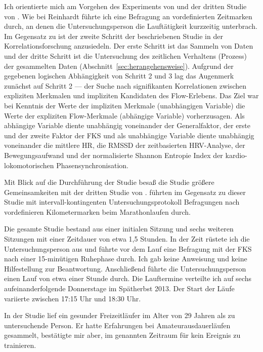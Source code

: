 Ich orientierte mich am Vorgehen des Experiments von \citet{Reinhardt2006} und der dritten Studie von \citet{Schuler2009}. Wie bei Reinhardt führte ich eine Befragung an vordefinierten Zeitmarken durch, an denen die Untersuchungsperson die Lauftätigkeit kurzzeitig unterbrach. Im Gegensatz zu \citet{Reinhardt2006} ist der zweite Schritt der beschriebenen Studie in der Korrelationsforschung anzusiedeln. Der erste Schritt ist das Sammeln von Daten und der dritte Schritt ist die Untersuchung des zeitlichen Verhaltens (Prozess) der gesammelten Daten (Abschnitt~\ref{sec:herangehensweise}). Aufgrund der gegebenen logischen Abhängigkeit von Schritt 2 und 3 lag das Augenmerk zunächst auf Schritt 2 --- der Suche nach signifikanten Korrelationen zwischen expliziten Merkmalen und impliziten Kandidaten des Flow-Erlebens. Das Ziel war bei Kenntnis der Werte der impliziten Merkmale (unabhängigen Variable) die Werte der expliziten Flow-Merkmale (abhängige Variable) vorherzusagen. Als abhängige Variable diente unabhängig voneinander der Generalfaktor, der erste und der zweite Faktor der \ac{FKS} und als unabhängige Variable diente unabhängig voneinander die mittlere \ac{HR}, die \acs{RMSSD} der zeitbasierten \ac{HRV}-Analyse, der Bewegungsaufwand und der normalisierte Shannon Entropie Index der kardio-lokomotorischen Phasensynchronisation.

Mit Blick auf die Durchführung der Studie besaß die Studie größere Gemeinsamkeiten mit der dritten Studie von \citet{Schuler2009}. \citet{Schuler2009} führten im Gegensatz zu dieser Studie mit intervall-kontingenten Untersuchungsprotokoll Befragungen nach vordefinieren Kilometermarken beim Marathonlaufen durch. 

Die gesamte Studie bestand aus einer initialen Sitzung und sechs weiteren Sitzungen mit einer Zeitdauer von etwa 1,5 Stunden. In der Zeit rüstete ich die Untersuchungsperson aus und führte vor dem Lauf eine Befragung mit der \ac{FKS} nach einer 15-minütigen Ruhephase durch. Ich gab keine Anweisung und keine Hilfestellung zur Beantwortung. Anschließend führte die Untersuchungsperson einen Lauf von etwa einer Stunde durch. Die Lauftermine verteilte ich auf sechs aufeinanderfolgende Donnerstage im Spätherbst 2013. Der Start der Läufe variierte zwischen 17:15 Uhr und 18:30 Uhr.

In der Studie lief ein gesunder Freizeitläufer im Alter von 29 Jahren als zu untersuchende Person. Er hatte Erfahrungen bei Amateurausdauerläufen gesammelt, bestätigte mir aber, im genannten Zeitraum für kein Ereignis zu trainieren.


